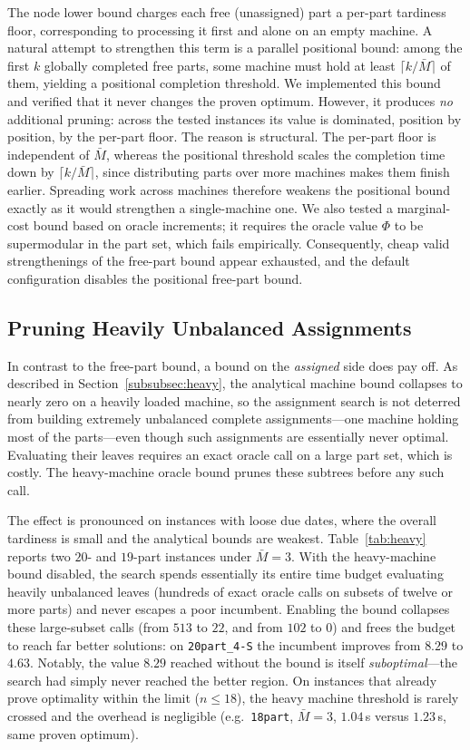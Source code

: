 \documentclass[letterpaper, 10 pt, conference]{ieeeconf}  %
\begin{document}
The node lower bound charges each free (unassigned) part a per-part tardiness
floor, corresponding to processing it first and alone on an empty machine. A
natural attempt to strengthen this term is a parallel positional bound: among
the first $k$ globally completed free parts, some machine must hold at least
$\lceil k/\bar M\rceil$ of them, yielding a positional completion threshold. We
implemented this bound and verified that it never changes the proven optimum.
However, it produces \emph{no} additional pruning: across the tested instances
its value is dominated, position by position, by the per-part floor. The reason
is structural. The per-part floor is independent of $\bar M$, whereas the
positional threshold scales the completion time down by $\lceil k/\bar M\rceil$,
since distributing parts over more machines makes them finish earlier. Spreading
work across machines therefore weakens the positional bound exactly as it would
strengthen a single-machine one. We also tested a marginal-cost bound based on
oracle increments; it requires the oracle value $\Phi$ to be supermodular in the
part set, which fails empirically. Consequently, cheap valid strengthenings of
the free-part bound appear exhausted, and the default configuration disables the
positional free-part bound.

\subsection{Pruning Heavily Unbalanced Assignments}
\label{subsec:res_heavy}

In contrast to the free-part bound, a bound on the \emph{assigned} side does pay
off. As described in Section~\ref{subsubsec:heavy}, the analytical machine bound
collapses to nearly zero on a heavily loaded machine, so the assignment search is
not deterred from building extremely unbalanced complete assignments---one
machine holding most of the parts---even though such assignments are essentially
never optimal. Evaluating their leaves requires an exact oracle call on a large
part set, which is costly. The heavy-machine oracle bound prunes these subtrees
before any such call.

The effect is pronounced on instances with loose due dates, where the overall
tardiness is small and the analytical bounds are weakest. Table~\ref{tab:heavy}
reports two $20$- and $19$-part instances under $\bar M=3$. With the heavy-machine
bound disabled, the search spends essentially its entire time budget evaluating
heavily unbalanced leaves (hundreds of exact oracle calls on subsets of twelve or
more parts) and never escapes a poor incumbent. Enabling the bound collapses these
large-subset calls (from $513$ to $22$, and from $102$ to $0$) and frees the
budget to reach far better solutions: on \texttt{20part\_4-S} the incumbent
improves from $8.29$ to $4.63$. Notably, the value $8.29$ reached without the
bound is itself \emph{suboptimal}---the search had simply never reached the better
region. On instances that already prove optimality within the limit ($n\le 18$),
the heavy machine threshold is rarely crossed and the overhead is negligible
(e.g.\ \texttt{18part}, $\bar M=3$, $1.04$\,s versus $1.23$\,s, same proven
optimum).
\end{document}
